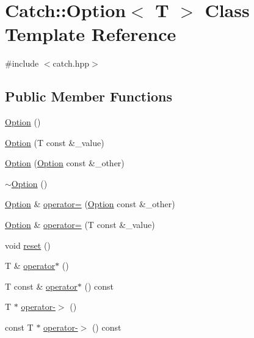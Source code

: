 \hypertarget{class_catch_1_1_option}{}\section{Catch\+:\+:Option$<$ T $>$ Class Template Reference}
\label{class_catch_1_1_option}


{\ttfamily \#include $<$catch.\+hpp$>$}

\subsection*{Public Member Functions}
\begin{DoxyCompactItemize}
\item 
\mbox{\hyperlink{class_catch_1_1_option_a8efb01b593d798decc80cbbdf311f2a3}{Option}} ()
\item 
\mbox{\hyperlink{class_catch_1_1_option_a5aeb9c22d48a6882bdf5fb4730b06c86}{Option}} (T const \&\+\_\+value)
\item 
\mbox{\hyperlink{class_catch_1_1_option_af02f2e4559f06384baec0def8c68c5fd}{Option}} (\mbox{\hyperlink{class_catch_1_1_option}{Option}} const \&\+\_\+other)
\item 
\mbox{\hyperlink{class_catch_1_1_option_a37fe90bb47bb909f150a5ad6be25581a}{$\sim$\+Option}} ()
\item 
\mbox{\hyperlink{class_catch_1_1_option}{Option}} \& \mbox{\hyperlink{class_catch_1_1_option_a78c65b15dd6b2fbd04c5012c43017c8f}{operator=}} (\mbox{\hyperlink{class_catch_1_1_option}{Option}} const \&\+\_\+other)
\item 
\mbox{\hyperlink{class_catch_1_1_option}{Option}} \& \mbox{\hyperlink{class_catch_1_1_option_a2be7e343ab22d6061726d32ab4622653}{operator=}} (T const \&\+\_\+value)
\item 
void \mbox{\hyperlink{class_catch_1_1_option_a37b4e0e5d4d56296adacd267a616f4e0}{reset}} ()
\item 
T \& \mbox{\hyperlink{class_catch_1_1_option_afd989852fa453731c3190dac63caccb0}{operator$\ast$}} ()
\item 
T const  \& \mbox{\hyperlink{class_catch_1_1_option_a734fc9c2eb1a1f7f8e8f6a4eb12160f0}{operator$\ast$}} () const
\item 
T $\ast$ \mbox{\hyperlink{class_catch_1_1_option_acad340798a16c8f700f8763119e90f31}{operator-\/$>$}} ()
\item 
const T $\ast$ \mbox{\hyperlink{class_catch_1_1_option_ae8343cbc36dbb95b2dce333d2a6fdc28}{operator-\/$>$}} () const

\end{DoxyCompactItemize}
